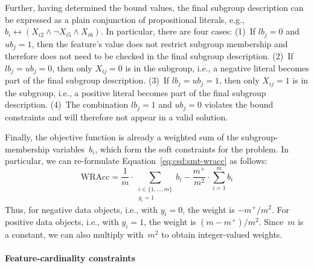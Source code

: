 \documentclass{article}
\theoremstyle{definition}
\begin{document}
Further, having determined the bound values, the final subgroup description can be expressed as a plain conjunction of propositional literals, e.g., $b_i \leftrightarrow \left( X_{i2} \land \lnot X_{i5} \land X_{i6} \right)$.
In particular, there are four cases:
(1)~If $\mathit{lb}_j = 0$ and $\mathit{ub}_j = 1$, then the feature's value does not restrict subgroup membership and therefore does not need to be checked in the final subgroup description.
(2)~If $\mathit{lb}_j = \mathit{ub}_j = 0$, then only $X_{ij} = 0$ is in the subgroup, i.e., a negative literal becomes part of the final subgroup description.
(3)~If $\mathit{lb}_j = \mathit{ub}_j = 1$, then only $X_{ij} = 1$ is in the subgroup, i.e., a positive literal becomes part of the final subgroup description.
(4)~The combination $\mathit{lb}_j = 1$ and $\mathit{ub}_j = 0$ violates the bound constraints and will therefore not appear in a valid solution.

Finally, the objective function is already a weighted sum of the subgroup-membership variables~$b_i$, which form the soft constraints for the problem.
In particular, we can re-formulate Equation~\ref{eq:csd:smt-wracc} as follows:
%
\begin{equation}
	\text{WRAcc} = \frac{1}{m} \cdot \sum_{\substack{i \in \{1, \dots, m\} \\ y_i = 1 }} b_i - \frac{m^+}{m^2} \cdot \sum_{i=1}^{m} b_i
	\label{eq:csd:maxsat-wracc}
\end{equation}
%
Thus, for negative data objects, i.e., with $y_i = 0$, the weight is $-m^+ / m^2$.
For positive data objects, i.e., with $y_i = 1$, the weight is $(m - m^+) / m^2$.
Since~$m$ is a constant, we can also multiply with~$m^2$ to obtain integer-valued weights.

\paragraph{Feature-cardinality constraints}
\end{document}
